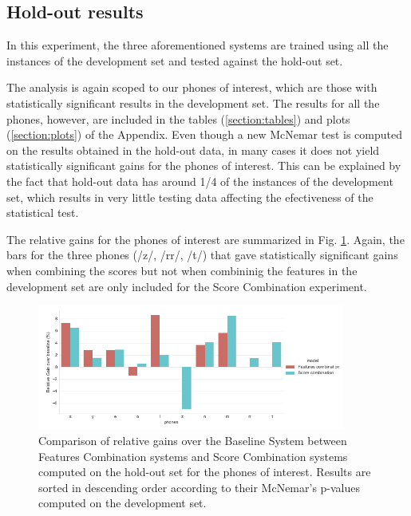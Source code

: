 \subsection{Hold-out results}

In this experiment, the three aforementioned systems are trained using all the instances of the
development set and tested against the hold-out set.

The analysis is again scoped to our phones of interest, which are those with statistically
significant results in the development set.
The results for all the phones, however, are included in the tables
(\ref{section:tables}) and plots (\ref{section:plots})
of the Appendix.
Even though a new McNemar test is computed on the
results obtained in the hold-out data, in many cases it does not yield statistically significant gains
for the phones of interest. This can be explained by the fact that hold-out data
has around 1/4 of the instances of the
development set, which results in very little testing data
affecting the efectiveness of the statistical test.

The relative gains for the phones of interest are summarized in Fig. \ref{fig:fusionMcnemarTest}.
Again, the bars for the three phones (/z/, /rr/, /t/) that gave statistically significant
gains when combining the scores but not when combininig the features in the development
set are only included for the Score Combination experiment.

\begin{figure}[H]
	\centering
	\includegraphics[width=0.9\textwidth]{files/figures/results/relatives/relative-fusion-systems-heldout-mcnemar.png}
	\caption{Comparison of relative gains over the Baseline System
	between Features Combination systems and Score Combination
	systems computed on the hold-out set for the phones of interest.
	Results are sorted
	in descending order according to their McNemar's p-values computed on the development set.}
	\label{fig:fusionMcnemarTest}
\end{figure}

